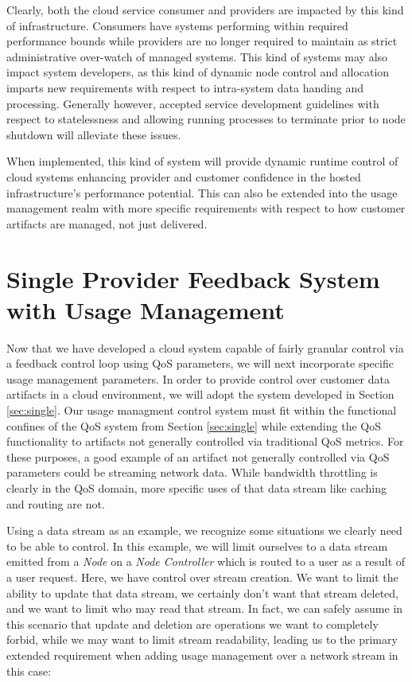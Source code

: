 \documentclass[times, 10pt,twocolumn]{article}
\begin{document}
Clearly, both the cloud service consumer and providers are impacted by this kind of infrastructure.  Consumers have systems performing within required performance bounds while providers are no longer required to maintain as strict administrative over-watch of managed systems.  This kind of systems may also impact system developers, as this kind of dynamic node control and allocation imparts new requirements with respect to intra-system data handing and processing.  Generally however, accepted service development guidelines with respect to statelessness and allowing running processes to terminate prior to node shutdown will alleviate these issues.

When implemented, this kind of system will provide dynamic runtime control of cloud systems enhancing provider and customer confidence in the hosted infrastructure's performance potential.  This can also be extended into the usage management realm with more specific requirements with respect to how customer artifacts are managed, not just delivered.

\section{Single Provider Feedback System with Usage Management}\label{sec:singleUm}
Now that we have developed a cloud system capable of fairly granular control via a feedback control loop using QoS parameters, we will next incorporate specific usage management parameters.  In order to provide control over customer data artifacts in a cloud environment, we will adopt the system developed in Section \ref{sec:single}.  Our usage managment control system must fit within the functional confines of the QoS system from Section \ref{sec:single} while extending the QoS functionality to artifacts not generally controlled via traditional QoS metrics.  For these purposes, a good example of an artifact not generally controlled via QoS parameters could be streaming network data.  While bandwidth throttling is clearly in the QoS domain, more specific uses of that data stream like caching and routing are not.   

Using a data stream as an example, we recognize some situations we clearly need to be able to control.  In this example, we will limit ourselves to a data stream emitted from a \textit{Node} on a \textit{Node Controller} which is routed to a user as a result of a user request.  Here, we have control over stream creation.  We want to limit the ability to update that data stream, we certainly don't want that stream deleted, and we want to limit who may read that stream.  In fact, we can safely assume in this scenario that update and deletion are operations we want to completely forbid, while we may want to limit stream readability, leading us to the primary extended requirement when adding usage management over a network stream in this case:
\end{document}

